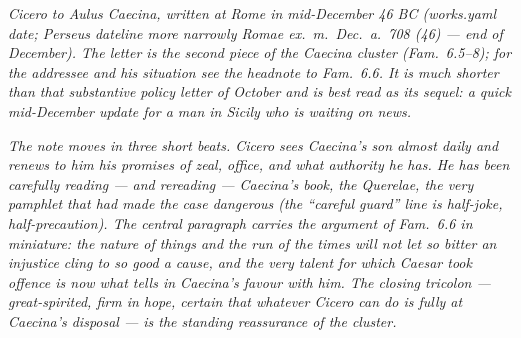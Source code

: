 
\textit{Cicero to Aulus Caecina, written at Rome in mid-December
46 BC (works.yaml date; Perseus dateline more narrowly
\textit{Romae ex.~m.~Dec.~a.~708 (46)} --- end of December). The
letter is the second piece of the Caecina cluster
(\textit{Fam.}~6.5--8); for the addressee and his situation see
the headnote to \textit{Fam.}~6.6. It is much shorter than that
substantive policy letter of October and is best read as its
sequel: a quick mid-December update for a man in Sicily who is
waiting on news.}

\textit{The note moves in three short beats. Cicero sees Caecina's
son almost daily and renews to him his promises of zeal,
office, and what authority he has. He has been carefully reading
--- and rereading --- Caecina's book, the \textit{Querelae},
the very pamphlet that had made the case dangerous (the
``careful guard'' line is half-joke, half-precaution). The
central paragraph carries the argument of \textit{Fam.}~6.6 in
miniature: the nature of things and the run of the times will
not let so bitter an injustice cling to so good a cause, and the
very talent for which Caesar took offence is now what tells in
Caecina's favour with him. The closing tricolon --- great-spirited,
firm in hope, certain that whatever Cicero can do is fully at
Caecina's disposal --- is the standing reassurance of the cluster.}
